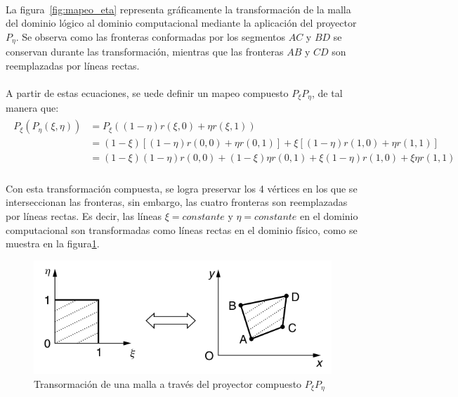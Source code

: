 \documentclass[letterpaper, openright, 12pt]{book}
\begin{document}
    \paragraph*{}
    La figura~\ref{fig:mapeo_eta} representa gráficamente la transformación
    de la malla del dominio lógico al dominio computacional mediante la
    aplicación del proyector $P_{\eta}$. Se observa como las fronteras
    conformadas por los segmentos $AC$ y $BD$ se conservan durante las
    transformación, mientras que las fronteras $AB$ y $CD$ son reemplazadas
    por líneas rectas.

    \paragraph*{}
    A partir de estas ecuaciones, se uede definir un mapeo compuesto
    $P_{\xi}P_{\eta}$, de tal manera que:
    \begin{align}
        \begin{aligned}
            P_{\xi}(P_{\eta}(\xi, \eta)) &= P_{\xi} ((1 - \eta)r(\xi, 0) + \eta r(\xi, 1)) \\
            &= (1 - \xi) \left[ (1 - \eta)r(0, 0) + \eta r(0, 1) \right] + \xi \left[ (1 - \eta)r(1, 0) + \eta r(1,1) \right]\\
            &= (1 - \xi)(1 - \eta)r(0, 0) + (1-\xi)\eta r(0, 1) + \xi(1 - \eta)r(1, 0) + \xi\eta r(1, 1)
        \end{aligned}
    \end{align}

    \paragraph*{}
    Con esta transformación compuesta, se logra preservar los 4 vértices en
    los que se interseccionan las fronteras, sin embargo, las cuatro
    fronteras son reemplazadas por líneas rectas. Es decir, las líneas
    $\xi = constante$ y $\eta = constante$ en el dominio computacional son
    transformadas como líneas rectas en el dominio físico, como se muestra
    en la figura\ref{fig:mapeo_xieta}.
    \begin{figure}[htbp!]
        \centering
        \includegraphics[keepaspectratio, width=120mm]{./Imagenes/mapeo_xieta}
        \caption[Transformación de malla por $P_{\xi}P_{\eta}$]{Transormación
        de una malla a través del proyector compuesto
        $P_{\xi}P_{\eta}$\cite{farrashkhalvat}}
        \label{fig:mapeo_xieta}
    \end{figure}
\end{document}
